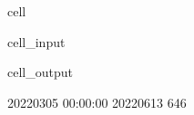 \documentclass[letterpaper,10pt,english]{jupyterBook}
\begin{document}
\begin{sphinxuseclass}{cell}\begin{sphinxVerbatimInput}

\begin{sphinxuseclass}{cell_input}
\begin{sphinxVerbatim}[commandchars=\\\{\}]
  
\end{sphinxVerbatim}

\end{sphinxuseclass}\end{sphinxVerbatimInput}
\begin{sphinxVerbatimOutput}

\begin{sphinxuseclass}{cell_output}
\begin{sphinxVerbatim}[commandchars=\\\{\}]
2022\PYGZhy{}03\PYGZhy{}05 00:00:00 2022\PYGZhy{}06\PYGZhy{}13
646
\end{sphinxVerbatim}

\end{sphinxuseclass}\end{sphinxVerbatimOutput}

\end{sphinxuseclass}
\end{document}
